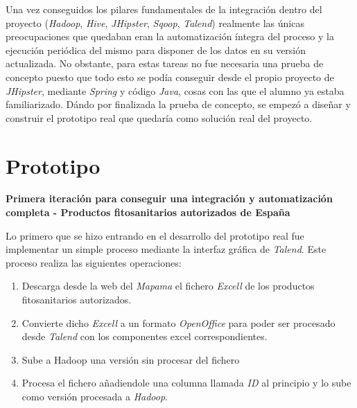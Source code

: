 \par
Una vez conseguidos los pilares fundamentales de la integración dentro del proyecto (\textit{Hadoop}, \textit{Hive}, \textit{JHipster}, \textit{Sqoop}, \textit{Talend}) realmente las únicas preocupaciones que quedaban eran la automatización íntegra del proceso y la ejecución periódica del mismo para disponer de los datos en su versión actualizada. No obstante, para estas tareas no fue necesaria una prueba de concepto puesto que todo esto se podía conseguir desde el propio proyecto de \textit{JHipster}, mediante \textit{Spring} y código \textit{Java}, cosas con las que el alumno ya estaba familiarizado. Dándo por finalizada la prueba de concepto, se empezó a diseñar y construir el prototipo real que quedaría como solución real del proyecto.


\section{Prototipo} \label{implementacion.prototipo}
\par 
\textbf{Primera iteración para conseguir una integración y automatización completa - Productos fitosanitarios autorizados de España}
\bigskip
\par Lo primero que se hizo entrando en el desarrollo del prototipo real fue implementar un simple proceso mediante la interfaz gráfica de \textit{Talend}. Este proceso realiza las siguientes operaciones: 
\begin{enumerate}
\item Descarga desde la web del \textit{Mapama} el fichero \textit{Excell} de los productos fitosanitarios autorizados.
\item Convierte dicho \textit{Excell} a un formato \textit{OpenOffice} para poder ser procesado desde \textit{Talend} con los componentes excel correspondientes. 
\item Sube a Hadoop una versión sin procesar del fichero
\item Procesa el fichero añadiendole una columna llamada \textit{ID} al principio y lo sube como versión procesada a \textit{Hadoop}. 
\end{enumerate} 

